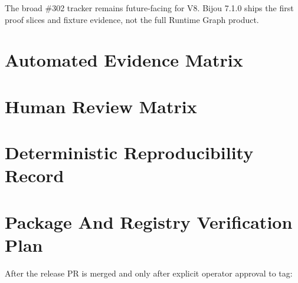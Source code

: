 The broad \#302 tracker remains future-facing for V8. Bijou 7.1.0 ships the first proof slices and fixture evidence, not the full Runtime Graph product.

\section{Automated Evidence Matrix}\label{record-260-automated-evidence-matrix}



\section{Human Review Matrix}\label{record-260-human-review-matrix}



\section{Deterministic Reproducibility Record}\label{record-260-deterministic-reproducibility-record}



\section{Package And Registry Verification Plan}\label{record-260-package-and-registry-verification-plan}

After the release PR is merged and only after explicit operator approval to tag:

